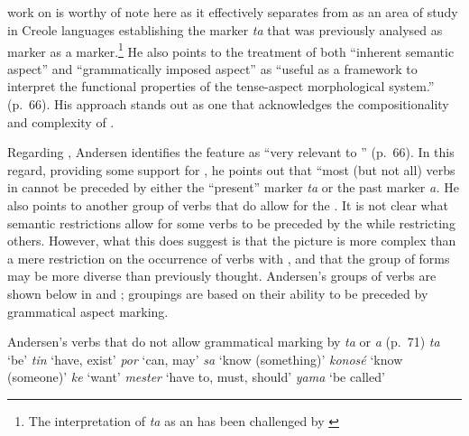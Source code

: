\subsection{\citet{Andersen1990}}\label{sec:2.1.6}

 work on  is worthy of note here as
it effectively separates  from  as an area of study in
Creole languages establishing the marker \textit{ta} that was
previously analysed as  marker as a 
marker.\footnote{The interpretation of \textit{ta} as an 
   has been challenged by  \citet{KouwenbergLefebvre2007}}
  He also points to the treatment of both ``inherent semantic aspect” and
  ``grammatically imposed aspect” as ``useful as a framework to interpret the functional properties of the  tense-aspect morphological system.” (p.~66).  His approach stands out as one that acknowledges the compositionality and
complexity of .

Regarding , Andersen identifies the feature  as
``very relevant to ” (p.~66).  In this regard, providing some
support for \citet{Bickerton1975}, he points out that ``most (but not
all)  verbs in  cannot be preceded by either the
``present”  marker \textit{ta} or the past 
marker \textit{a.}  He also points to another group of  verbs
that do allow for the  .  It is not clear
what semantic restrictions allow for some  verbs to be preceded
by the   while restricting others.  However,
what this does suggest is that the picture is more complex than a mere
restriction on the occurrence of  verbs with 
, and that the group of  forms may be more
diverse than previously thought.  Andersen’s groups of  verbs
are shown below in  and ; groupings are
based on their ability to be preceded by  grammatical
aspect marking.

\ea\label{ex:2:18} Andersen’s  verbs that do not allow
  grammatical marking by \textit{ta} or \textit{a}
(p.~71) 
\ea \textit{ta} `be' \ex \textit{tin} `have, exist'
\ex \textit{por} `can, may' 
\ex \textit{sa} `know (something)'
\ex \textit{konosé} `know (someone)' 
\ex \textit{ke} `want' 
\ex \textit{mester} `have to, must, should'
\ex \textit{yama} `be called'
\z \z


